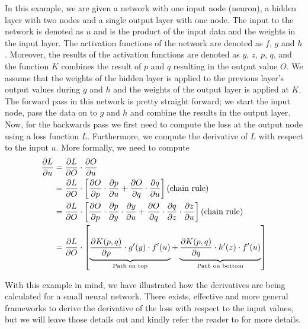 In this example, we are given a network with one input node (neuron), a hidden layer with two nodes and a single output layer with one node. The input to the network is denoted as $u$ and is the product of the input data and the weights in the input layer. The activation functions of the network are denoted as $f$, $g$ and $h$. Moreover, the results of the activation functions are denoted as $y$, $z$, $p$, $q$, and the function $K$ combines the result of $p$ and $q$ resulting in the output value $O$. We assume that the weights of the hidden layer is applied to the previous layer's output values during $g$ and $h$ and the weights of the output layer is applied at $K$. The forward pass in this network is pretty straight forward; we start the input node, pass the data on to $g$ and $h$ and combine the results in the output layer. Now, for the backwards pass we first need to compute the loss at the output node using a loss function $L$. Furthermore, we compute the derivative of $L$ with respect to the input $u$. More formally, we need to compute
\begin{align}
    \parder{L}{u}
    &= \parder{L}{O} \cdot \parder{O}{u} \\
    &= \parder{L}{O} \cdot \left[
    \parder{O}{p} \cdot \parder{p}{u} +
    \parder{O}{q} \cdot \parder{q}{u}
    \right] \text{(chain rule)} \\
    &= \parder{L}{O} \cdot \left[
    \parder{O}{p} \cdot \parder{p}{y} \cdot \parder{y}{u} + 
    \parder{O}{q} \cdot \parder{q}{z} \cdot \parder{z}{u}
    \right] \text{(chain rule)} \\
    &= \parder{L}{O} \cdot \left[
    \undertext{\parder{K(p, q)}{p} \cdot g'(y) \cdot f'(u)}{Path on top} + 
    \undertext{\parder{K(p, q)}{q} \cdot h'(z) \cdot f'(u)}{Path on bottom}
    \right]
\end{align}

With this example in mind, we have illustrated how the derivatives are being calculated for a small neural network. There exists, effective and more general frameworks to derive the derivative of the loss with respect to the input values, but we will leave those details out and kindly refer the reader to \cite[Chapter 1.3]{Aggarwal18} for more details.

